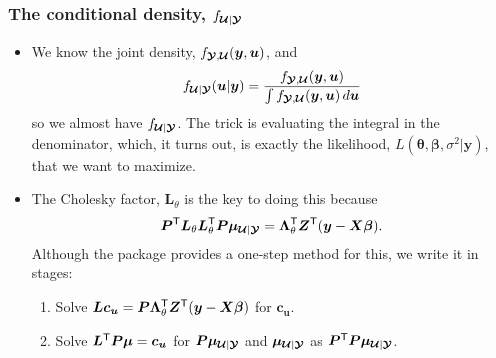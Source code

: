 \documentclass[dvipsnames,pdflatex,beamer]{beamer}
\newcommand{\bLt}{\ensuremath{\bm\Lambda_\theta}}
\begin{document}
\begin{frame}
  \frametitle{The conditional density, $f_{\bm{\mathcal{U}}|\bm{\mathcal{Y}}}$}
  \begin{itemize}
  \item We know the joint density, $f_{\bm{\mathcal{Y}},\bm{\mathcal{U}}}(\bm y,\bm u)$, and
    \begin{displaymath}
      f_{\bm{\mathcal{U}}|\bm{\mathcal{Y}}}(\bm u|\bm y)=\frac{f_{\bm{\mathcal{Y}},\bm{\mathcal{U}}}(\bm y,\bm u)}
      {\int f_{\bm{\mathcal{Y}},\bm{\mathcal{U}}}(\bm y,\bm u)\,d\bm u}
    \end{displaymath}
    so we almost have $f_{\bm{\mathcal{U}}|\bm{\mathcal{Y}}}$. The trick is evaluating
    the integral in the denominator, which, it turns out, is exactly
    the likelihood, $L(\bm\theta,\bm\beta,\sigma^2|\bm y)$, that we
    want to maximize.
  \item The Cholesky factor, $\bm L_\theta$ is the
    key to doing this because
    \begin{displaymath}
      \bm P\trans\bm L_\theta\bm L\trans_\theta\bm P
      \bm\mu_{\bc U|\bc Y}=
      \bLt\trans\bm Z\trans(\bm y-\bm X\bm\beta) .
    \end{displaymath}
    Although the  package provides a one-step
     method for this, we write it in stages:
    \begin{enumerate}
    \item Solve $\bm L\bm c_{\bm u}=\bm P\bLt\trans\bm Z\trans(\bm y-\bm
      X\bm\beta)$ for $\bm c_{\bm u}$.
    \item Solve $\bm L^\mathsf{T}\bm P\bm\mu=\bm c_{\bm u}$ for $\bm
      P\bm\mu_{\bm{\mathcal{U}}|\bm{\mathcal{Y}}}$ and $\bm\mu_{\bm{\mathcal{U}}|\bm{\mathcal{Y}}}$ as $\bm
      P^\mathsf{T}\bm P\bm\mu_{\bm{\mathcal{U}}|\bm{\mathcal{Y}}}$.
    \end{enumerate}
  \end{itemize}
\end{frame}
\end{document}
